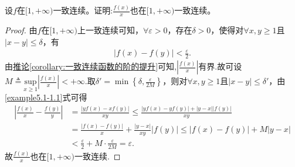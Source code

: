 \documentclass[../../main.tex]{subfiles}%
\begin{document}
\begin{example}
设\(f\)在\([1,+\infty)\)一致连续。证明:\(\frac{f(x)}{x}\)也在\([1,+\infty)\)一致连续。
\end{example}
\begin{proof}
由\(f\)在\([1, +\infty)\)上一致连续可知，\(\forall \varepsilon > 0\)，存在\(\delta > 0\)，使得对\(\forall x, y \geqslant 1\)且\(\vert x - y \vert \leqslant \delta\)，有
\begin{align}\label{example5.1-1.1}
\vert f(x) - f(y) \vert < \frac{\varepsilon}{2}. 
\end{align}
由\hyperref[corollary:一致连续函数的阶的提升]{推论\ref{corollary:一致连续函数的阶的提升}}可知,$\left| \frac{f\left( x \right)}{x} \right|$有界.故可设$M\triangleq \underset{x\geqslant 1}{\mathrm{sup}}\left| \frac{f\left( x \right)}{x} \right|<+\infty$.取\(\delta' = \min \left\{ \delta, \frac{\varepsilon}{2M} \right\}\)，则对\(\forall x, y \geqslant 1\)且\(\vert x - y \vert \leqslant \delta'\)，由\eqref{example5.1-1.1}式可得
\begin{align*}
\left| \frac{f\left( x \right)}{x}-\frac{f\left( y \right)}{y} \right|&=\frac{\left| yf\left( x \right) -xf\left( y \right) \right|}{xy}\leqslant \frac{\left| yf\left( x \right) -yf\left( y \right) \right|+\left| y-x \right|\left| f\left( y \right) \right|}{xy}
\\
&=\frac{\left| f\left( x \right) -f\left( y \right) \right|}{x}+\frac{\left| y-x \right|}{xy}\left| f\left( y \right) \right|\leqslant \left| f\left( x \right) -f\left( y \right) \right|+M\left| y-x \right|
\\
&<\frac{\varepsilon}{2}+M\cdot \frac{\varepsilon}{2M}=\varepsilon .
\end{align*}
故\(\frac{f(x)}{x}\)也在\([1,+\infty)\)一致连续.
\end{proof}
\end{document}
